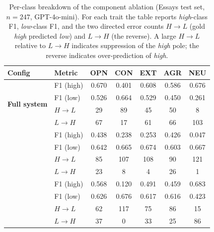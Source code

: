 \documentclass[../main.tex]{subfiles}
\begin{document}
\begin{table}[htbp]
  \centering
  \caption{Per-class breakdown of the component ablation
    (Essays test set, $n=247$, GPT-4o-mini). For each trait the table reports
    \textit{high}-class F1, \textit{low}-class F1, and the two directed error
    counts $H{\to}L$ (gold \textit{high} predicted \textit{low}) and
    $L{\to}H$ (the reverse). A large $H{\to}L$ relative to $L{\to}H$ indicates
    suppression of the \textit{high} pole; the reverse indicates over-prediction
    of \textit{high}.}
  \label{tab:ablation-perclass}
  \small
  \begin{tabular}{llccccc}
    \toprule
    \textbf{Config} & \textbf{Metric}
      & \textbf{OPN} & \textbf{CON} & \textbf{EXT}
      & \textbf{AGR} & \textbf{NEU} \\
    \midrule
    \multirow{4}{*}{\textbf{Full system}}
      & F1 (high)     & 0.670 & 0.401 & 0.608 & 0.586 & 0.676 \\
      & F1 (low)      & 0.526 & 0.664 & 0.529 & 0.450 & 0.261 \\
      & $H{\to}L$     & 29    & 89    & 45    & 50    & 8     \\
      & $L{\to}H$     & 67    & 17    & 61    & 66    & 103   \\
    \addlinespace
    \multirow{4}{*}{$-$ retrieval}
      & F1 (high)     & 0.438 & 0.238 & 0.253 & 0.426 & 0.047 \\
      & F1 (low)      & 0.642 & 0.665 & 0.674 & 0.603 & 0.667 \\
      & $H{\to}L$     & 85    & 107   & 108   & 90    & 121   \\
      & $L{\to}H$     & 23    & 8     & 4     & 26    & 1     \\
    \addlinespace
    \multirow{4}{*}{$-$ reasoning}
      & F1 (high)     & 0.568 & 0.120 & 0.491 & 0.459 & 0.683 \\
      & F1 (low)      & 0.626 & 0.676 & 0.617 & 0.616 & 0.423 \\
      & $H{\to}L$     & 62    & 117   & 75    & 86    & 15    \\
      & $L{\to}H$     & 37    & 0     & 33    & 25    & 86    \\
    \bottomrule
  \end{tabular}
\end{table}
\end{document}
